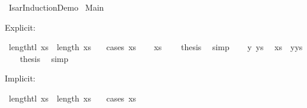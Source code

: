 %
\begin{isabellebody}%
%
%
\isadelimtheory
%
\endisadelimtheory
%
\isatagtheory
{}\isamarkupfalse%
\ Isar{\isacharunderscore}{\kern0pt}Induction{\isacharunderscore}{\kern0pt}Demo\isanewline
{}\ Main\isanewline
{}%
\endisatagtheory
{\isafoldtheory}%
%
\isadelimtheory
%
\endisadelimtheory
%
\isadelimdocument
%
\endisadelimdocument
%
\isatagdocument
%
\isamarkuptrue%
%
\endisatagdocument
{\isafolddocument}%
%
\isadelimdocument
%
\endisadelimdocument
%
\begin{isamarkuptext}%
Explicit:%
\end{isamarkuptext}\isamarkuptrue%
\isamarkupfalse%
\ {\isachardoublequoteopen}length{\isacharparenleft}{\kern0pt}tl\ xs{\isacharparenright}{\kern0pt}\ {\isacharequal}{\kern0pt}\ length\ xs\ {\isacharminus}{\kern0pt}\ {}{\isachardoublequoteclose}\isanewline
%
\isadelimproof
%
\endisadelimproof
%
\isatagproof
{}\isamarkupfalse%
\ {\isacharparenleft}{\kern0pt}cases\ xs{\isacharparenright}{\kern0pt}\isanewline
\ \ \isamarkupfalse%
\ {\isachardoublequoteopen}xs\ {\isacharequal}{\kern0pt}\ {\isacharbrackleft}{\kern0pt}{\isacharbrackright}{\kern0pt}{\isachardoublequoteclose}\ \isamarkupfalse%
\ {\isacharquery}{\kern0pt}thesis\ \isamarkupfalse%
\ simp\isanewline
{}\isamarkupfalse%
\isanewline
\ \ \isamarkupfalse%
\ y\ ys\ \isamarkupfalse%
\ {\isachardoublequoteopen}xs\ {\isacharequal}{\kern0pt}\ y{\isacharhash}{\kern0pt}ys{\isachardoublequoteclose}\isanewline
\ \ \isamarkupfalse%
\ {\isacharquery}{\kern0pt}thesis\ \isamarkupfalse%
\ simp\isanewline
{}\isamarkupfalse%
%
\endisatagproof
{\isafoldproof}%
%
\isadelimproof
%
\endisadelimproof
%
\begin{isamarkuptext}%
Implicit:%
\end{isamarkuptext}\isamarkuptrue%
\isamarkupfalse%
\ {\isachardoublequoteopen}length{\isacharparenleft}{\kern0pt}tl\ xs{\isacharparenright}{\kern0pt}\ {\isacharequal}{\kern0pt}\ length\ xs\ {\isacharminus}{\kern0pt}\ {}{\isachardoublequoteclose}\isanewline
%
\isadelimproof
%
\endisadelimproof
%
\isatagproof
{}\isamarkupfalse%
\ {\isacharparenleft}{\kern0pt}cases\ xs{\isacharparenright}{\kern0pt}\isanewline

\end{isabellebody}
